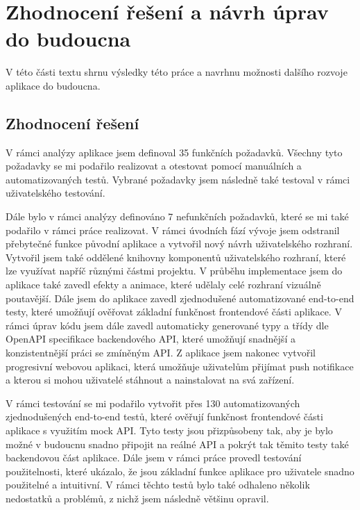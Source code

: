 \section{Zhodnocení řešení a návrh úprav do budoucna}

V této části textu shrnu výsledky této práce a navrhnu možnosti dalšího rozvoje aplikace do budoucna.

\subsection{Zhodnocení řešení}

V rámci analýzy aplikace jsem definoval 35 funkčních požadavků. Všechny tyto požadavky se mi podařilo realizovat a otestovat pomocí manuálních a automatizovaných testů. Vybrané požadavky jsem následně také testoval v rámci uživatelského testování.

Dále bylo v rámci analýzy definováno 7 nefunkčních požadavků, které se mi také podařilo v rámci práce realizovat. V rámci úvodních fází vývoje jsem odstranil přebytečné funkce původní aplikace a vytvořil nový návrh uživatelského rozhraní. Vytvořil jsem také oddělené knihovny komponentů uživatelského rozhraní, které lze využívat napříč různými částmi projektu. V průběhu implementace jsem do aplikace také zavedl efekty a animace, které udělaly celé rozhraní vizuálně poutavější. Dále jsem do aplikace zavedl zjednodušené automatizované end-to-end testy, které umožňují ověřovat základní funkčnost frontendové části aplikace. V rámci úprav kódu jsem dále zavedl automaticky generované typy a třídy dle OpenAPI specifikace backendového API, které umožňují snadnější a konzistentnější práci se zmíněným API. Z aplikace jsem nakonec vytvořil progresivní webovou aplikaci, která umožňuje uživatelům přijímat push notifikace a kterou si mohou uživatelé stáhnout a nainstalovat na svá zařízení.

V rámci testování se mi podařilo vytvořit přes 130 automatizovaných zjednodušených end-to-end testů, které ověřují funkčnost frontendové části aplikace s využitím mock API. Tyto testy jsou přizpůsobeny tak, aby je bylo možné v budoucnu snadno připojit na reálné API a pokrýt tak těmito testy také backendovou část aplikace. Dále jsem v rámci práce provedl testování použitelnosti, které ukázalo, že jsou základní funkce aplikace pro uživatele snadno použitelné a intuitivní. V rámci těchto testů bylo také odhaleno několik nedostatků a problémů, z nichž jsem následně většinu opravil.

